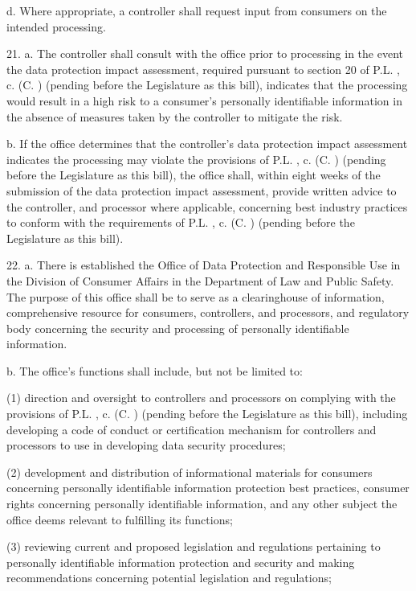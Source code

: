      d.    Where appropriate, a controller shall request input from consumers on the intended processing.

 

     21.  a.  The controller shall consult with the office prior to processing in the event the data protection impact assessment, required pursuant to section 20 of P.L.    , c.    (C.      ) (pending before the Legislature as this bill), indicates that the processing would result in a high risk to a consumer's personally identifiable information in the absence of measures taken by the controller to mitigate the risk.

     b.    If the office determines that the controller's data protection impact assessment indicates the processing may violate the provisions of P.L.    , c.    (C.      ) (pending before the Legislature as this bill), the office shall, within eight weeks of the submission of the data protection impact assessment, provide written advice to the controller, and processor where applicable, concerning best industry practices to conform with the requirements of P.L.    , c.    (C.      ) (pending before the Legislature as this bill).

 

     22.  a.  There is established the Office of Data Protection and Responsible Use in the Division of Consumer Affairs in the Department of Law and Public Safety. The purpose of this office shall be to serve as a clearinghouse of information, comprehensive resource for consumers, controllers, and processors, and regulatory body concerning the security and processing of personally identifiable information.

     b.    The office's functions shall include, but not be limited to:

     (1)   direction and oversight to controllers and processors on complying with the provisions of P.L.    , c.    (C.      ) (pending before the Legislature as this bill), including developing a code of conduct or certification mechanism for controllers and processors to use in developing data security procedures;

     (2)   development and distribution of informational materials for consumers concerning personally identifiable information protection best practices, consumer rights concerning personally identifiable information, and any other subject the office deems relevant to fulfilling its functions;

     (3)   reviewing current and proposed legislation and regulations pertaining to personally identifiable information protection and security and making recommendations concerning potential legislation and regulations;

